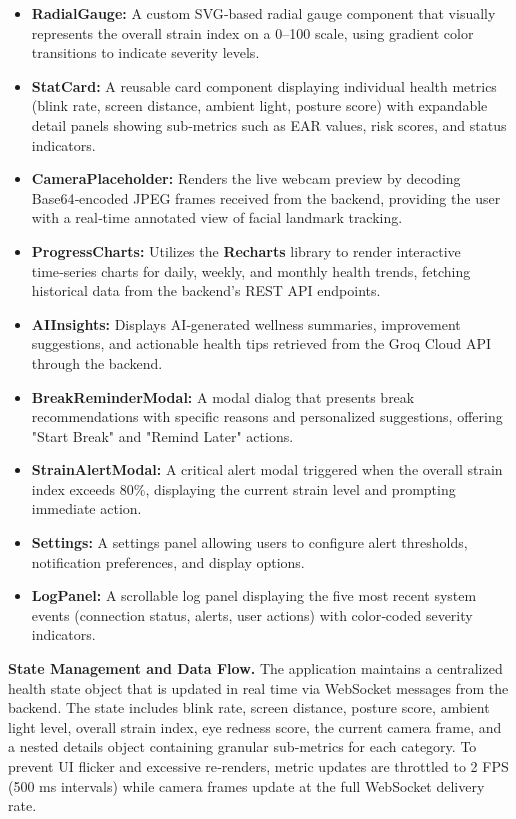 \documentclass[12pt]{report}
\begin{document}
\begin{itemize}
    \item \textbf{RadialGauge:} A custom SVG‑based radial gauge component that visually represents the overall strain index on a 0–100 scale, using gradient color transitions to indicate severity levels.
    \item \textbf{StatCard:} A reusable card component displaying individual health metrics (blink rate, screen distance, ambient light, posture score) with expandable detail panels showing sub‑metrics such as EAR values, risk scores, and status indicators.
    \item \textbf{CameraPlaceholder:} Renders the live webcam preview by decoding Base64‑encoded JPEG frames received from the backend, providing the user with a real‑time annotated view of facial landmark tracking.
    \item \textbf{ProgressCharts:} Utilizes the \textbf{Recharts} library to render interactive time‑series charts for daily, weekly, and monthly health trends, fetching historical data from the backend's REST API endpoints.
    \item \textbf{AIInsights:} Displays AI‑generated wellness summaries, improvement suggestions, and actionable health tips retrieved from the Groq Cloud API through the backend.
    \item \textbf{BreakReminderModal:} A modal dialog that presents break recommendations with specific reasons and personalized suggestions, offering "Start Break" and "Remind Later" actions.
    \item \textbf{StrainAlertModal:} A critical alert modal triggered when the overall strain index exceeds 80\%, displaying the current strain level and prompting immediate action.
    \item \textbf{Settings:} A settings panel allowing users to configure alert thresholds, notification preferences, and display options.
    \item \textbf{LogPanel:} A scrollable log panel displaying the five most recent system events (connection status, alerts, user actions) with color‑coded severity indicators.
\end{itemize}

\textbf{State Management and Data Flow.} The application maintains a centralized health state object that is updated in real time via WebSocket messages from the backend. The state includes blink rate, screen distance, posture score, ambient light level, overall strain index, eye redness score, the current camera frame, and a nested details object containing granular sub‑metrics for each category. To prevent UI flicker and excessive re‑renders, metric updates are throttled to 2 FPS (500 ms intervals) while camera frames update at the full WebSocket delivery rate.
\end{document}
